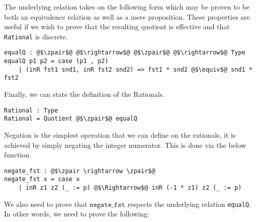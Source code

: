 \documentclass[12pt,twoside,maitrise]{dms}
\theoremstyle{definition}
\numberwithin{equation}{section}
\numberwithin{table}{chapter}
\numberwithin{figure}{chapter}
\newcommand\id[1] {\texttt{#1}}
\begin{document}
The underlying relation takes on the following form which may be proven to be
both an equivalence relation as well as a mere proposition. These properties are
useful if we wish to prove that the resulting quotient is effective and that
\id{Rational} is discrete.

\begin{verbatim}
equalQ : @$\zpair$@ @$\rightarrow$@ @$\zpair$@ @$\rightarrow$@ Type
equalQ p1 p2 = case (p1 , p2)
    | (inR fst1 snd1, inR fst2 snd2) => fst1 * snd2 @$\equiv$@ snd1 * fst2
\end{verbatim}

Finally, we can state the definition of the Rationals.

\begin{verbatim}
Rational : Type
Rational = Quotient @$\zpair$@ equalQ
\end{verbatim}

Negation is the simplest operation that we can define on the rationals, it is
achieved by simply negating the integer numerator. This is done via the below
function.

\begin{verbatim}
negate_fst : @$\zpair \rightarrow \zpair$@
negate_fst x = case x
    | inR z1 z2 (_ := p) @$\Rightarrow$@ inR (-1 * z1) z2 (_ := p)
\end{verbatim}

We also need to prove that $\id{negate\_fst}$ respects the underlying relation
\id{equalQ}. In other words, we need to prove the following:
\end{document}
